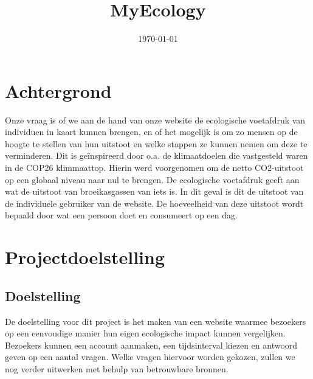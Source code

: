 \documentclass{uva-inf-article}
\title{MyEcology}
\date{\today}
\begin{document}
\maketitle


\tableofcontents


\section{Achtergrond}
Onze vraag is of we aan de hand van onze website de ecologische voetafdruk van individuen in kaart kunnen brengen, en of het mogelijk is om zo mensen op de hoogte te stellen van hun uitstoot en welke stappen ze kunnen nemen om deze te verminderen.
Dit is geïnspireerd door o.a. de klimaatdoelen die vastgesteld waren in de COP26 klimmaattop. Hierin werd voorgenomen om de netto CO2-uitstoot op een globaal niveau naar nul te brengen.
De ecologische voetafdruk geeft aan wat de uitstoot van broeikasgassen van iets is. In dit geval is dit de uitstoot van de individuele gebruiker van de website. De hoeveelheid van deze uitstoot wordt bepaald door wat een persoon doet en consumeert op een dag.


\section{Projectdoelstelling}


\subsection{Doelstelling}
De doelstelling voor dit project is het maken van een website waarmee bezoekers op een eenvoudige manier hun eigen ecologische impact kunnen vergelijken. Bezoekers kunnen een account aanmaken, een tijdsinterval kiezen en antwoord geven op een aantal vragen. Welke vragen hiervoor worden gekozen, zullen we nog verder uitwerken met behulp van betrouwbare bronnen.
\end{document}
